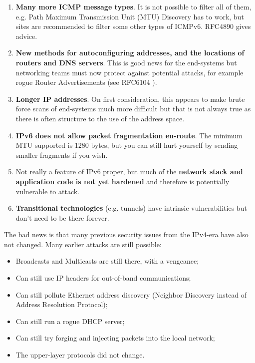 \begin{enumerate}

\item {\bf Many more ICMP message types}. It is not possible to filter all of them, e.g. Path Maximum Transmission Unit (MTU) Discovery has to work, but sites are recommended to filter some other types of ICMPv6. RFC4890 \cite{rfc} gives advice.

\item {\bf New methods for autoconfiguring addresses, and the locations of routers and DNS servers}. This is good news for the end-systems but networking teams must now protect against potential attacks, for example rogue Router Advertisements (see RFC6104 \cite{rfc}).

\item {\bf Longer IP addresses}. On first consideration, this appears to make brute force scans of end-systems much more difficult but that is not always true as there is often structure to the use of the address space. 

\item {\bf IPv6 does not allow packet fragmentation en-route}. The minimum MTU supported is 1280 bytes, but you can still hurt yourself by sending smaller fragments if you wish. 

\item Not really a feature of IPv6 proper, but much of the {\bf network stack and application code is not yet hardened} and therefore is potentially vulnerable to attack.

\item {\bf Transitional technologies} (e.g. tunnels) have intrinsic vulnerabilities but don't need to be there forever.

\end{enumerate}

The bad news is that many previous security issues from the IPv4-era have also not changed. 
Many earlier attacks are still possible:

\begin {itemize}
\item Broadcasts and Multicasts are still there, with a vengeance;
\item Can still use IP headers for out-of-band communications;
\item Can still pollute Ethernet address discovery (Neighbor Discovery instead of Address Resolution Protocol);
\item Can still run a rogue DHCP server;
\item Can still try forging and injecting packets into the local network;
\item The upper-layer protocols did not change.
\end {itemize}




